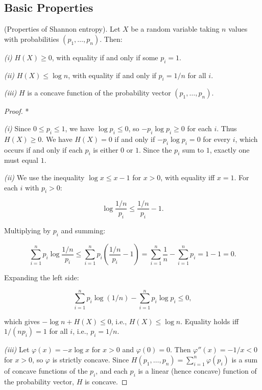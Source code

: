 \subsection{Basic Properties}\label{sec:11.2.2}

\begin{proposition}\label{prop:11.3}
(Properties of Shannon entropy). Let $X$ be a random variable taking $n$ values with probabilities $(p_1, \ldots, p_n)$. Then:

\textit{(i)} $H(X) \geq 0$, with equality if and only if some $p_i = 1$.

\textit{(ii)} $H(X) \leq \log n$, with equality if and only if $p_i = 1/n$ for all $i$.

\textit{(iii)} $H$ is a concave function of the probability vector $(p_1, \ldots, p_n)$.
\end{proposition}


\begin{proof}
*

\textit{(i)} Since $0 \leq p_i \leq 1$, we have $\log p_i \leq 0$, so $-p_i \log p_i \geq 0$ for each $i$. Thus $H(X) \geq 0$. We have $H(X) = 0$ if and only if $-p_i \log p_i = 0$ for every $i$, which occurs if and only if each $p_i$ is either $0$ or $1$. Since the $p_i$ sum to $1$, exactly one must equal $1$.

\textit{(ii)} We use the inequality $\log x \leq x - 1$ for $x > 0$, with equality iff $x = 1$. For each $i$ with $p_i > 0$:

\[
\log \frac{1/n}{p_i} \leq \frac{1/n}{p_i} - 1.
\]

Multiplying by $p_i$ and summing:

\[
\sum_{i=1}^n p_i \log \frac{1/n}{p_i} \leq \sum_{i=1}^n p_i \left(\frac{1/n}{p_i} - 1\right) = \sum_{i=1}^n \frac{1}{n} - \sum_{i=1}^n p_i = 1 - 1 = 0.
\]

Expanding the left side:

\[
\sum_{i=1}^n p_i \log(1/n) - \sum_{i=1}^n p_i \log p_i \leq 0,
\]

which gives $-\log n + H(X) \leq 0$, i.e., $H(X) \leq \log n$. Equality holds iff $1/(np_i) = 1$ for all $i$, i.e., $p_i = 1/n$.

\textit{(iii)} Let $\varphi(x) = -x \log x$ for $x > 0$ and $\varphi(0) = 0$. Then $\varphi''(x) = -1/x < 0$ for $x > 0$, so $\varphi$ is strictly concave. Since $H(p_1, \ldots, p_n) = \sum_{i=1}^n \varphi(p_i)$ is a sum of concave functions of the $p_i$, and each $p_i$ is a linear (hence concave) function of the probability vector, $H$ is concave.
\end{proof}


